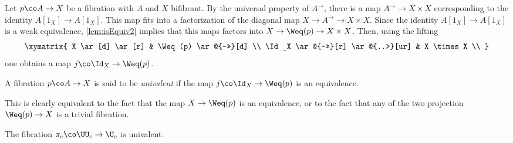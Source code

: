 Let $p \co A \to X$ be a fibration with $A$ and $X$ bifibrant. By the universal property of $A^\to$, there
is a map $A^{\to} \to X \times X$ corresponding to the identity $A[1_X] \rightarrow A[1_X]$. This map
fits into a factorization of the diagonal map $X \rightarrow A^{\to} \to X \times X$. Since the identity
$A[1_X] \rightarrow A[1_X]$ is a weak equivalence, \cref{lem:isEquiv2} implies that this maps factors into $X \rightarrow \Weq(p) \to X \times X$. Then, using the lifting
\[
\xymatrix{
X \ar[d] \ar[r] & \Weq(p) \ar@{->>}[d] \\
\Id_X \ar@{->>}[r] \ar@{..>}[ur] & X \times X \\ 
}
\]
one obtains a map $j \co \Id_X \rightarrow \Weq(p)$.

\begin{definition} \label{def:univalentFib}
A fibration $p \co A \to X$  is said to be \emph{univalent} if the map $j \co \Id_X \rightarrow \Weq(p)$ is an equivalence.
\end{definition}

This is clearly equivalent to the fact that the map $X \rightarrow \Weq(p)$ is an equivalence, or to the fact that any of the two projection $\Weq(p) \to X$ is a trivial fibration.


\bigskip


\begin{proposition}
The fibration $\pi_c \co \UU_c \to \U_c$ is univalent.
\end{proposition}



